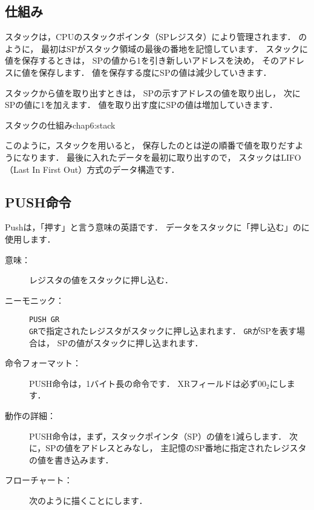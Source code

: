\subsection{仕組み}

スタックは，CPUのスタックポインタ（SPレジスタ）により管理されます．
のように，
最初はSPがスタック領域の最後の番地を記憶しています．
スタックに値を保存するときは，
SPの値から1を引き新しいアドレスを決め，
そのアドレスに値を保存します．
値を保存する度にSPの値は減少していきます．

スタックから値を取り出すときは，
SPの示すアドレスの値を取り出し，
次にSPの値に1を加えます．
値を取り出す度にSPの値は増加していきます．

{スタックの仕組み}{chap6:stack}

このように，スタックを用いると，
保存したのとは逆の順番で値を取りだすようになります．
最後に入れたデータを最初に取り出すので，
スタックはLIFO（Last In First Out）方式のデータ構造です．

\subsection{PUSH命令}

Pushは，「押す」と言う意味の英語です．
データをスタックに「押し込む」のに使用します．

\begin{description}
\item[意味：]レジスタの値をスタックに押し込む．

\item[ニーモニック：]{\tt PUSH  GR} \\
{\tt GR}で指定されたレジスタがスタックに押し込まれます．
{\tt GR}がSPを表す場合は，
SPの値がスタックに押し込まれます．

\item[命令フォーマット：]PUSH命令は，1バイト長の命令です．
XRフィールドは必ず$00_2$にします．


\item[動作の詳細：]PUSH命令は，まず，スタックポインタ（SP）の値を1減らします．
次に，SPの値をアドレスとみなし，
主記憶のSP番地に指定されたレジスタの値を書き込みます．

\item[フローチャート：]
次のように描くことにします．

\begin{center}
\end{center}

\end{description}

